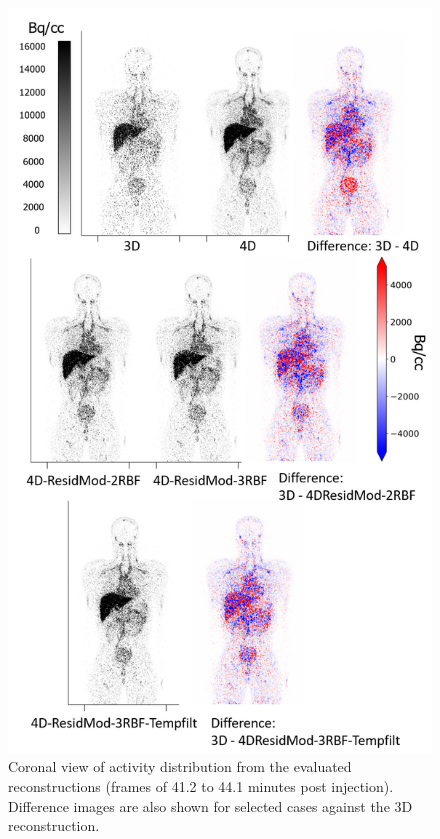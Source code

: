 \begin{figure} [h!]
\centering
\includegraphics[scale=1.25, angle=0]{3_Results/3_4_Residual/figures/Frame14DifferencesV2.png}
\caption{Coronal view of activity distribution from the evaluated reconstructions (frames of 41.2 to 44.1 minutes post injection). Difference images are also shown for selected cases against the 3D reconstruction.}
\label{fig:Frame14Differences}
\end{figure}

